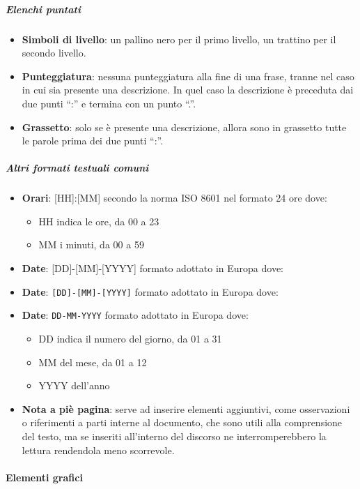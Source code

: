 			\subparagraph{Elenchi puntati}\label{PS:Documentazione:Design:NormeT:ElenchiPuntati}
			\begin{itemize}
				\item \textbf{Simboli di livello}: un pallino nero per il primo livello, un trattino per il secondo livello.
				\item \textbf{Punteggiatura}: nessuna punteggiatura alla fine di una frase, tranne nel caso in cui sia presente una descrizione.
					In quel caso la descrizione è preceduta dai due punti ``:'' e termina con un punto ``.''.
				\item \textbf{Grassetto}: solo se è presente una descrizione, allora sono in grassetto tutte le parole prima dei due punti ``:''.
			\end{itemize}

			\subparagraph{Altri formati testuali comuni} \label{PS:Documentazione:Design:NormeT:AltriFormati}
			\begin{itemize}
				\item \textbf{Orari}: [HH]:[MM] secondo la norma ISO 8601 nel formato 24 ore dove:
				\begin{itemize}
					\item HH indica le ore, da 00 a 23
					\item MM i minuti, da 00 a 59
				\end{itemize}
				\item \textbf{Date}: [DD]-[MM]-[YYYY] formato adottato in Europa dove:
				\item \textbf{Date}: \texttt{[DD]-[MM]-[YYYY]} formato adottato in Europa dove:
				\item \textbf{Date}: \texttt{DD-MM-YYYY} formato adottato in Europa dove:
				\begin{itemize}
					\item DD indica il numero del giorno, da 01 a 31
					\item MM del mese, da 01 a 12
					\item YYYY dell'anno
				\end{itemize}
				\item \textbf{Nota a piè pagina}: serve ad inserire elementi aggiuntivi, come osservazioni o riferimenti a parti interne al documento,
				che sono utili alla comprensione del testo, ma se inseriti all'interno del discorso ne interromperebbero la lettura rendendola meno scorrevole.
			\end{itemize}


			\paragraph{Elementi grafici}

